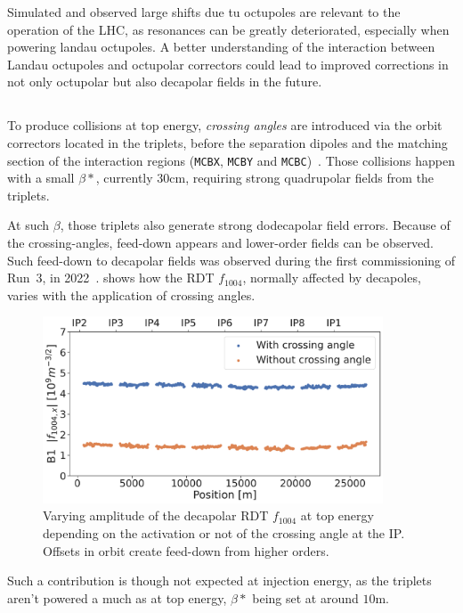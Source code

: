 Simulated and observed large shifts due tu octupoles are relevant to the operation of the LHC, as
resonances can be greatly deteriorated, especially when powering landau octupoles.
A better understanding of the interaction between Landau octupoles and octupolar correctors could
lead to improved corrections in not only octupolar but also decapolar fields in the future.




\subsection{}


To produce collisions at top energy, \textit{crossing angles} are introduced via the orbit
correctors located in the triplets, before the separation dipoles and the matching section of the
interaction regions (\texttt{MCBX}, \texttt{MCBY} and \texttt{MCBC})~\cite{de_maria_lhc_2008}. Those
collisions happen with a small $\beta*$, currently 30cm, requiring strong quadrupolar fields from
the triplets.

At such $\beta$, those triplets also generate strong dodecapolar field errors. Because of the
crossing-angles, feed-down appears and lower-order fields can be observed.
Such feed-down to decapolar fields was observed during the first commissioning of Run~3, in
2022~\cite{maclean_prospects_2022}.
 shows how the RDT $f_{1004}$, normally affected by
decapoles, varies with the application of crossing angles.

\begin{figure}[!htb]
    \centering
    \includegraphics[width=0.9\textwidth]{./images/f1004x_feed-down_b6_triplets.pdf}
    \caption{Varying amplitude of the decapolar RDT $f_{1004}$ at top energy depending on the
    activation or not of the crossing angle at the IP. Offsets in orbit create feed-down from higher
    orders.}
    \label{fig:decapoles:f1004_from_feeddown}
\end{figure}

Such a contribution is though not expected at injection energy, as the triplets aren't powered a
much as at top energy, $\beta*$ being set at around $10$m.